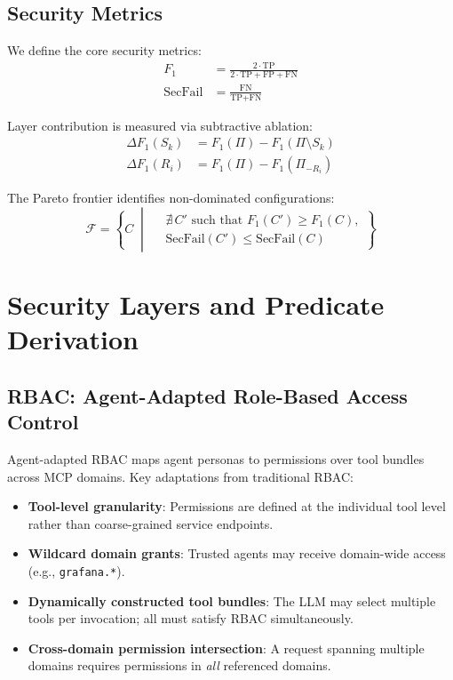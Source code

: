 \documentclass[10pt,a4paper,twocolumn]{article}
\begin{document}
\subsection{Security Metrics}
\label{sec:security_metrics}

We define the core security metrics:
\begin{align}
F_1 &= \frac{2 \cdot \text{TP}}{2 \cdot \text{TP} + \text{FP} + \text{FN}} \label{eq:f1} \\
\text{SecFail} &= \frac{\text{FN}}{\text{TP} + \text{FN}} \label{eq:secfail}
\end{align}

Layer contribution is measured via subtractive ablation:
\begin{align}
\Delta F_1(S_k) &= F_1(\Pi) - F_1(\Pi \setminus S_k) \label{eq:delta_f1_layer} \\
\Delta F_1(R_i) &= F_1(\Pi) - F_1(\Pi_{-R_i}) \label{eq:delta_f1_rule}
\end{align}

The Pareto frontier identifies non-dominated configurations:
\begin{equation}
\mathcal{F} = \left\{ C \;\middle|\;
\begin{aligned}
&\nexists\, C' \text{ such that } F_1(C') \geq F_1(C), \\
&\text{SecFail}(C') \leq \text{SecFail}(C)
\end{aligned}
\right\}
\label{eq:pareto}
\end{equation}

\section{Security Layers and Predicate Derivation}
\label{sec:layers}

\subsection{RBAC: Agent-Adapted Role-Based Access Control}
\label{sec:rbac_layer}

Agent-adapted RBAC maps agent personas to permissions over tool bundles across MCP domains. Key adaptations from traditional RBAC:

\begin{itemize}
  \item \textbf{Tool-level granularity}: Permissions are defined at the individual tool level rather than coarse-grained service endpoints.
  \item \textbf{Wildcard domain grants}: Trusted agents may receive domain-wide access (e.g., \texttt{grafana.*}).
  \item \textbf{Dynamically constructed tool bundles}: The LLM may select multiple tools per invocation; all must satisfy RBAC simultaneously.
  \item \textbf{Cross-domain permission intersection}: A request spanning multiple domains requires permissions in \emph{all} referenced domains.
\end{itemize}
\end{document}
